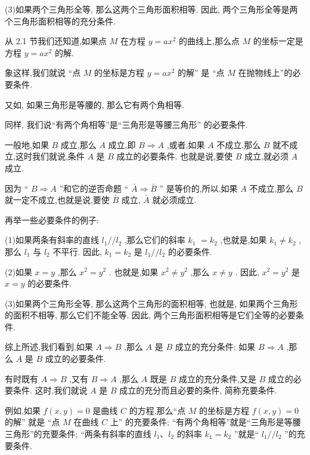 \documentclass[lang=cn,newtx,10.5pt,scheme=chinese]{elegantbook}
\begin{document}
(3)如果两个三角形全等, 那么这两个三角形面积相等. 因此, 两个三角形全等是两个三角形面积相等的充分条件.

从 2.1 节我们还知道,如果点 \(M\) 在方程 \(y = a{x}^{2}\) 的曲线上,那么点 \(M\) 的坐标一定是方程 \(y = a{x}^{2}\) 的解.

象这样,我们就说 “点 \(M\) 的坐标是方程 \(y = a{x}^{2}\) 的解” 是 “点 \(M\) 在抛物线上”的必要条件.

又如, 如果三角形是等腰的, 那么它有两个角相等.

同样, 我们说“有两个角相等”是“三角形是等腰三角形” 的必要条件.
\begin{definition}[必要条件]
一般地,如果 \(B\) 成立,那么 \(A\) 成立,即 \(B \Rightarrow A\) ,或者,如果 \(A\) 不成立,那么 \(B\) 就不成立,这时我们就说,条件 \(A\) 是 \(B\) 成立的必要条件. 也就是说,要使 \(B\) 成立,就必须 \(A\) 成立.
\end{definition}
\begin{corollary}[逆否命题等价性]
  因为 “ \(B \Rightarrow A\) ”和它的逆否命题 “ \(\bar{A} \Rightarrow \bar{B}\) ” 是等价的,所以,如果 \(A\) 不成立,那么 \(B\) 就一定不成立,也就是说,要使 \(\bar{B}\) 成立, \(\bar{A}\) 就必须成立.
\end{corollary}
再举一些必要条件的例子:

(1)如果两条有斜率的直线 \({l}_{1}//{l}_{2}\) ,那么它们的斜率 \({k}_{1}\) \(= {k}_{2}\) ,也就是,如果 \({k}_{1} \neq {k}_{2}\) ,那么 \({l}_{1}\) 与 \({l}_{2}\) 不平行. 因此, \({k}_{1} = {k}_{2}\) 是 \({l}_{1}//{l}_{2}\) 的必要条件.

(2)如果 \(x = y\) ,那么 \({x}^{2} = {y}^{2}\) . 也就是,如果 \({x}^{2} \neq {y}^{2}\) ,那么 \(x \neq y\) . 因此, \({x}^{2} = {y}^{2}\) 是 \(x = y\) 的必要条件.

(3)如果两个三角形全等, 那么这两个三角形的面积相等, 也就是, 如果两个三角形的面积不相等, 那么它们不能全等. 因此, 两个三角形面积相等是它们全等的必要条件.

综上所述,我们看到,如果 \(A \Rightarrow B\) ,那么 \(A\) 是 \(B\) 成立的充分条件; 如果 \(B \Rightarrow A\) ,那么 \(A\) 是 \(B\) 成立的必要条件.
\begin{definition}[充要条件]
  有时既有 \(A \Rightarrow B\) ,又有 \(B \Rightarrow A\) ,那么 \(A\) 既是 \(B\) 成立的充分条件,又是 \(B\) 成立的必要条件. 这时,我们就说 \(A\) 是 \(B\) 成立的充分而且必要的条件, 简称充要条件.
\end{definition}
例如,如果 \(f\left( {x,y}\right) = 0\) 是曲线 \(C\) 的方程,那么“点 \(M\) 的坐标是方程 \(f\left( {x,y}\right) = 0\) 的解” 就是 “点 \(M\) 在曲线 \(C\) 上” 的充要条件; “有两个角相等”就是“三角形是等腰三角形”的充要条件; “两条有斜率的直线 \({l}_{1}\text{、}{l}_{2}\) 的斜率 \({k}_{1} = {k}_{2}\) ”就是“ \({l}_{1}//{l}_{2}\) ”的充要条件.
\end{document}
